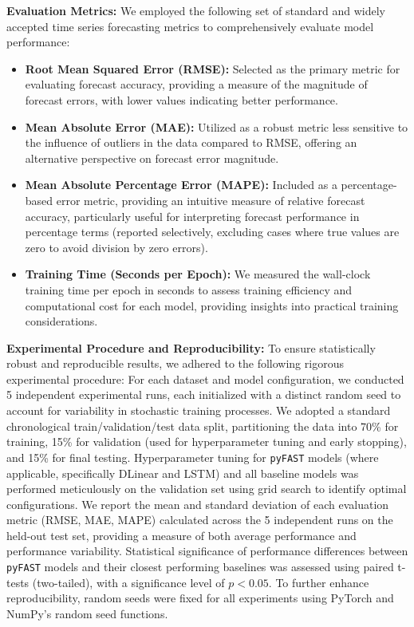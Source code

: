 \documentclass[twoside,11pt]{article}
\begin{document}
\textbf{Evaluation Metrics:}  We employed the following set of standard and widely accepted time series forecasting metrics to comprehensively evaluate model performance:

\begin{itemize}
    \item    \textbf{Root Mean Squared Error (RMSE):}  Selected as the primary metric for evaluating forecast accuracy, providing a measure of the magnitude of forecast errors, with lower values indicating better performance.
    \item   \textbf{Mean Absolute Error (MAE):}  Utilized as a robust metric less sensitive to the influence of outliers in the data compared to RMSE, offering an alternative perspective on forecast error magnitude.
    \item   \textbf{Mean Absolute Percentage Error (MAPE):}  Included as a percentage-based error metric, providing an intuitive measure of relative forecast accuracy, particularly useful for interpreting forecast performance in percentage terms (reported selectively, excluding cases where true values are zero to avoid division by zero errors).
    \item  \textbf{Training Time (Seconds per Epoch):}  We measured the wall-clock training time per epoch in seconds to assess training efficiency and computational cost for each model, providing insights into practical training considerations.
\end{itemize}

\textbf{Experimental Procedure and Reproducibility:}  To ensure statistically robust and reproducible results, we adhered to the following rigorous experimental procedure: For each dataset and model configuration, we conducted 5 independent experimental runs, each initialized with a distinct random seed to account for variability in stochastic training processes. We adopted a standard chronological train/validation/test data split, partitioning the data into 70\% for training, 15\% for validation (used for hyperparameter tuning and early stopping), and 15\% for final testing. Hyperparameter tuning for \texttt{pyFAST} models (where applicable, specifically DLinear and LSTM) and all baseline models was performed meticulously on the validation set using grid search to identify optimal configurations.  We report the mean and standard deviation of each evaluation metric (RMSE, MAE, MAPE) calculated across the 5 independent runs on the held-out test set, providing a measure of both average performance and performance variability.  Statistical significance of performance differences between \texttt{pyFAST} models and their closest performing baselines was assessed using paired t-tests (two-tailed), with a significance level of $p<0.05$.  To further enhance reproducibility, random seeds were fixed for all experiments using PyTorch and NumPy's random seed functions.
\end{document}
